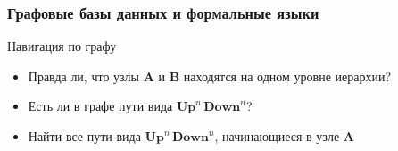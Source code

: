 \documentclass[xcolor=table]{beamer}
\begin{document}
\begin{frame}[fragile] \frametitle{Графовые базы данных и формальные языки}
  \begin{minipage}[m]{0.45\linewidth}
  \end{minipage}\hfill
  \begin{minipage}[m]{0.5\linewidth}
  Навигация по графу
  \begin{itemize}
        \item Правда ли, что узлы \textbf{A} и \textbf{B} находятся на одном уровне иерархии?
        \item Есть ли в графе пути вида $\textbf{Up}^n \, \textbf{Down}^n$?
        \item Найти все пути вида $\textbf{Up}^n \, \textbf{Down}^n$, начинающиеся в узле \textbf{A}
  \end{itemize}

  \end{minipage}
\end{frame}
\end{document}
